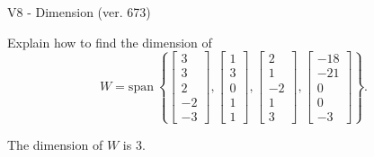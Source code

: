 \begin{exercise}
  \begin{exerciseTitle}V8 - Dimension (ver. 673)\end{exerciseTitle}
  \begin{exerciseStatement}
    Explain how to find the dimension of 
\[W=\mathrm{span}\ \left\{\left[\begin{array}{r}
3 \\
3 \\
2 \\
-2 \\
-3
\end{array}\right] , \left[\begin{array}{r}
1 \\
3 \\
0 \\
1 \\
1
\end{array}\right] , \left[\begin{array}{r}
2 \\
1 \\
-2 \\
1 \\
3
\end{array}\right] , \left[\begin{array}{r}
-18 \\
-21 \\
0 \\
0 \\
-3
\end{array}\right]\right\}.\]



  \end{exerciseStatement}
  \begin{exerciseAnswer}
   The dimension of \(W\) is  \(3\).
  


  \end{exerciseAnswer}
\end{exercise}